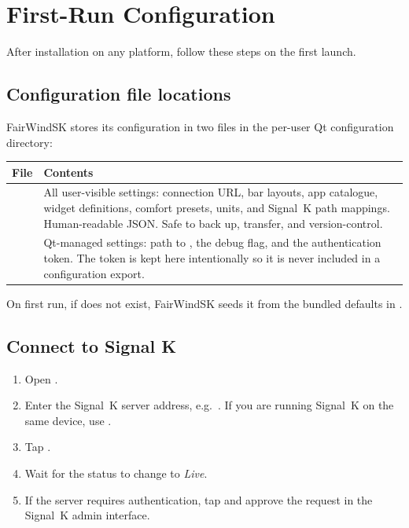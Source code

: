 \section{First-Run Configuration}
\label{app:firstrun}

After installation on any platform, follow these steps on the first launch.

\subsection{Configuration file locations}

FairWindSK stores its configuration in two files in the per-user
Qt configuration directory:

\begin{longtable}{L{3.6cm}L{10.1cm}}
\toprule
{}
\color{white}\sffamily\bfseries File &
\color{white}\sffamily\bfseries Contents \\
\midrule
{}  &
  All user-visible settings: connection URL, bar layouts, app catalogue,
  widget definitions, comfort presets, units, and Signal~K path mappings.
  Human-readable JSON.
  Safe to back up, transfer, and version-control. \\
   &
  Qt-managed settings: path to , the debug flag,
  and the authentication token.
  The token is kept here intentionally so it is never included in a
  configuration export. \\
\bottomrule
\end{longtable}

On first run, if  does not exist, FairWindSK
seeds it from the bundled defaults in
.

\subsection{Connect to Signal K}

\begin{enumerate}
  \item Open .
  \item Enter the Signal~K server address,
        e.g.\ .
        If you are running Signal~K on the same device,
        use .
  \item Tap .
  \item Wait for the status to change to \textit{Live}.
  \item If the server requires authentication,
        tap  and approve the request in the
        Signal~K admin interface.
\end{enumerate}

